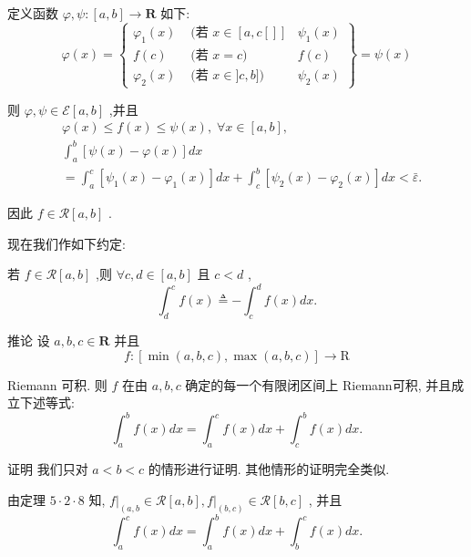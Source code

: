 定义函数 $\varphi ,\psi  : \left\lbrack  {a,b}\right\rbrack   \rightarrow  \mathbf{R}$ 如下:
$$\varphi \left( x\right)  = \left\{  \begin{array}{lll} {\varphi }_{1}\left( x\right) & \text{ (若 }x \in  \left\lbrack  {a,c\left\lbrack  \right\rbrack  }\right\rbrack  & {\psi }_{1}\left( x\right) \\  f\left( c\right) & \text{ (若 }x = c) & f\left( c\right) \\  {\varphi }_{2}\left( x\right) & \text{ (若 }x \in  \rbrack c,b\rbrack ) & {\psi }_{2}\left( x\right)  \end{array}\right\}   = \psi \left( x\right)$$

则 $\varphi ,\psi  \in  \mathcal{E}\left\lbrack  {a,b}\right\rbrack$ ,并且
\begin{align*}
	&\varphi \left( x\right)  \leq  f\left( x\right)  \leq  \psi \left( x\right) ,\;\forall x \in  \left\lbrack  {a,b}\right\rbrack  ,\\
	&{\int }_{a}^{b}\left\lbrack  {\psi \left( x\right)  - \varphi \left( x\right) }\right\rbrack  {dx}\\
	&= {\int }_{a}^{c}\left\lbrack  {{\psi }_{1}\left( x\right)  - {\varphi }_{1}\left( x\right) }\right\rbrack  {dx} + {\int }_{c}^{b}\left\lbrack  {{\psi }_{2}\left( x\right)  - {\varphi }_{2}\left( x\right) }\right\rbrack  {dx} < \bar{\varepsilon }.
\end{align*}

因此 $f \in  \mathcal{R}\left\lbrack  {a,b}\right\rbrack$ .

现在我们作如下约定:

若 $f \in  \mathcal{R}\left\lbrack  {a,b}\right\rbrack$ ,则 $\forall c,d \in  \left\lbrack  {a,b}\right\rbrack$ 且 $c < d$ ,
$${\int }_{d}^{c}f\left( x\right)  \triangleq   - {\int }_{c}^{d}f\left( x\right) {dx}.$$

推论 设 $a,b,c \in  \mathbf{R}$ 并且
$$f : \left\lbrack  {\min \left( {a,b,c}\right) ,\max \left( {a,b,c}\right) }\right\rbrack   \rightarrow  \mathrm{R}$$

Riemann 可积. 则 $f$ 在由 $a,b,c$ 确定的每一个有限闭区间上 Riemann可积, 并且成立下述等式:
$${\int }_{a}^{b}f\left( x\right) {dx} = {\int }_{a}^{c}f\left( x\right) {dx} + {\int }_{c}^{b}f\left( x\right) {dx}.$$

证明 我们只对 $a < b < c$ 的情形进行证明. 其他情形的证明完全类似.

由定理 $5 \cdot  2 \cdot  8$ 知, ${\left. f\right| }_{\left( a,b\right. } \in  \mathcal{R}\left\lbrack  {a,b}\right\rbrack  ,{\left. f\right| }_{\left( b,c\right) } \in  \mathcal{R}\left\lbrack  {b,c}\right\rbrack$ , 并且
$${\int }_{a}^{c}f\left( x\right) {dx} = {\int }_{a}^{b}f\left( x\right) {dx} + {\int }_{b}^{c}f\left( x\right) {dx}.$$

